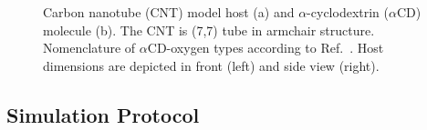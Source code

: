 \documentclass[9pt,lessons]{livecoms}
\begin{document}
\begin{figure}[htb!]
  \centering    
  \caption{
  Carbon nanotube (CNT) model host (a) and $\alpha$-cyclodextrin ($\alpha$CD) molecule (b). The CNT is (7,7) tube in armchair structure.
  Nomenclature of $\alpha$CD-oxygen types according to Ref.~.
  Host dimensions are depicted in front (left) and side view (right).}
  \label{fig:systems}
\end{figure}


\subsection{Simulation Protocol}
\label{sec:theory_setup}
\end{document}
